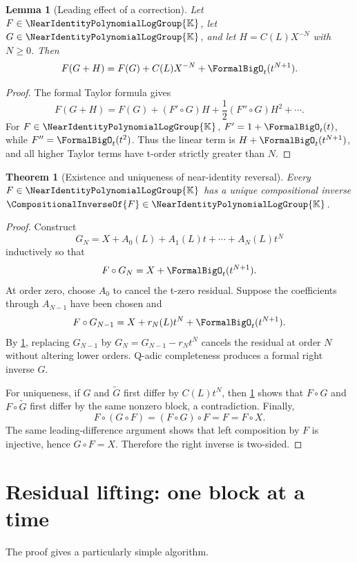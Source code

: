 \documentclass[11pt,openany]{book}
\theoremstyle{definition}
\theoremstyle{plain}
\newtheorem{theorem}{Theorem}[chapter]
\newtheorem{lemma}{Lemma}[chapter]
\theoremstyle{remark}
\newcommand{\K}{\mathbb{K}}
\newcommand{\rev}[1]{\CompositionalInverseOf{#1}}
\newcommand{\compose}{\mathbin{\circ}}
\begin{document}
\begin{lemma}[Leading effect of a correction]\label{lem:leading-correction}
Let \(F\in\NearIdentityPolynomialLogGroup{\K}\), let \(G\in\NearIdentityPolynomialLogGroup{\K}\), and let
\(H=C(L)X^{-N}\) with \(N\ge0\).  Then
\begin{equation}\label{eq:leading-correction}
 F(G+H)=F(G)+C(L)X^{-N}+\FormalBigO_t(t^{N+1}).
\end{equation}
\end{lemma}
\begin{proof}
The formal Taylor formula gives
\[
 F(G+H)=F(G)+(F'\compose G)H+\frac12(F''\compose G)H^2+\cdots.
\]
For \(F\in\NearIdentityPolynomialLogGroup{\K}\), \(F'=1+\FormalBigO_t(t)\), while \(F''=\FormalBigO_t(t^2)\).  Thus the
linear term is \(H+\FormalBigO_t(t^{N+1})\), and all higher Taylor terms have t-order
strictly greater than \(N\).
\end{proof}

\begin{theorem}[Existence and uniqueness of near-identity reversal]\label{thm:reversion-exists}
Every \(F\in\NearIdentityPolynomialLogGroup{\K}\) has a unique compositional inverse
\(\rev{F}\in\NearIdentityPolynomialLogGroup{\K}\).
\end{theorem}
\begin{proof}
Construct
\[
 G_N=X+A_0(L)+A_1(L)t+\cdots+A_N(L)t^N
\]
inductively so that
\[
 F\compose G_N=X+\FormalBigO_t(t^{N+1}).
\]
At order zero, choose \(A_0\) to cancel the t-zero residual.  Suppose the
coefficients through \(A_{N-1}\) have been chosen and
\[
 F\compose G_{N-1}=X+r_N(L)t^N+\FormalBigO_t(t^{N+1}).
\]
By \cref{lem:leading-correction}, replacing \(G_{N-1}\) by
\(G_N=G_{N-1}-r_Nt^N\) cancels the residual at order \(N\) without altering
lower orders.  Q-adic completeness produces a formal right inverse \(G\).

For uniqueness, if \(G\) and \(\widetilde G\) first differ by
\(C(L)t^N\), then \cref{lem:leading-correction} shows that
\(F\compose G\) and \(F\compose\widetilde G\) first differ by the same nonzero
block, a contradiction.  Finally,
\[
 F\compose(G\compose F)=(F\compose G)\compose F=F=F\compose X.
\]
The same leading-difference argument shows that left composition by \(F\) is
injective, hence \(G\compose F=X\).  Therefore the right inverse is two-sided.
\end{proof}

\section{Residual lifting: one block at a time}
The proof gives a particularly simple algorithm.
\end{document}
